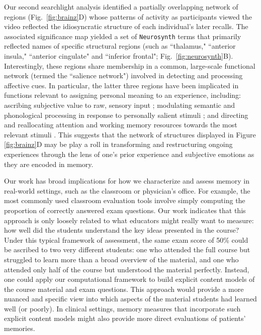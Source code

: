 \documentclass{article}
\begin{document}
Our second searchlight analysis identified a partially overlapping network of regions (Fig.~\ref{fig:brainz}D) whose patterns of activity as participants viewed the video reflected the idiosyncratic structure of each individual's later recalls.  The associated significance map yielded a set of \texttt{Neurosynth} terms that primarily reflected names of specific structural regions (such as ``thalamus," ``anterior insula," ``anterior cingulate" and ``inferior frontal"; Fig.~\ref{fig:neurosynth}B).  Interestingly, these regions share membership in a common, large-scale functional network (termed the ``salience network") involved in detecting and processing affective cues.  In particular, the latter three regions have been implicated in functions relevant to assigning personal meaning to an experience, including: ascribing subjective value to raw, sensory input \citep{MedfCrit10}; modulating semantic and phonological processing in response to personally salient stimuli \citep{KellEtal07b}; and directing and reallocating attention and working memory resources towards the most relevant stimuli \citep{MenoUddi10}.  This suggests that the network of structures displayed in Figure \ref{fig:brainz}D may be play a roll in transforming and restructuring ongoing experiences through the lens of one's prior experience and subjective emotions as they are encoded in memory.

Our work has broad implications for how we characterize and assess memory in real-world settings, such as the classroom or physician's office.  For example, the most commonly used classroom evaluation tools involve simply computing the proportion of correctly answered exam questions.  Our work indicates that this approach is only loosely related to what educators might really want to measure: how well did the students understand the key ideas presented in the course?  Under this typical framework of assessment, the same exam score of 50\% could be ascribed to two very different students: one who attended the full course but struggled to learn more than a broad overview of the material, and one who attended only half of the course but understood the material perfectly.  Instead, one could apply our computational framework to build explicit content models of the course material and exam questions.  This approach would provide a more nuanced and specific view into which aspects of the material students had learned well (or poorly).  In clinical settings, memory measures that incorporate such explicit content models might also provide more direct evaluations of patients' memories.
\end{document}
